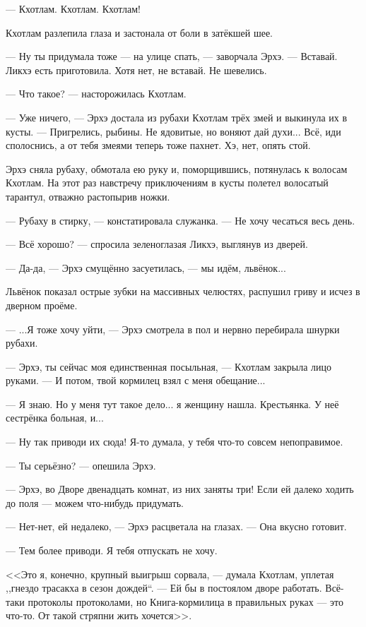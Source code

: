 \documentclass[a4paper,10pt,fleqn]{book}\usepackage{cooltooltips}\usepackage{polyglossia}\setdefaultlanguage{english}\setotherlanguage{russian}\defaultfontfeatures{Ligatures=TeX,Mapping=tex-text} \usepackage{xcolor}\definecolor{lightgray}{HTML}{bbbbbb}\color{lightgray}\newcommand{\ml}[3]{\textcolor{black}{#3}}
\newcommand{\asterism}{\vspace{1em}{\centering\Large\bfseries$\ast~\ast~\ast$\par}\vspace{1em}}
\begin{document}
\asterism

--- Кхотлам.
Кхотлам.
Кхотлам!

Кхотлам разлепила глаза и застонала от боли в затёкшей шее.

--- Ну ты придумала тоже --- на улице спать, --- заворчала Эрхэ.
--- Вставай.
Ликхэ есть приготовила.
Хотя нет, не вставай.
Не шевелись.

--- Что такое? --- насторожилась Кхотлам.

--- Уже ничего, --- Эрхэ достала из рубахи Кхотлам трёх змей и выкинула их в кусты.
--- Пригрелись, рыбины.
Не ядовитые, но воняют дай духи...
Всё, иди сполоснись, а от тебя змеями теперь тоже пахнет.
Хэ, нет, опять стой.

Эрхэ сняла рубаху, обмотала ею руку и, поморщившись, потянулась к волосам Кхотлам.
На этот раз навстречу приключениям в кусты полетел волосатый тарантул, отважно растопырив ножки.

--- Рубаху в стирку, --- констатировала служанка.
--- Не хочу чесаться весь день.

--- Всё хорошо? --- спросила зеленоглазая Ликхэ, выглянув из дверей.

--- Да-да, --- Эрхэ смущённо засуетилась, --- мы идём, львёнок...

Львёнок показал острые зубки на массивных челюстях, распушил гриву и исчез в дверном проёме.

--- ...Я тоже хочу уйти, --- Эрхэ смотрела в пол и нервно перебирала шнурки рубахи.

--- Эрхэ, ты сейчас моя единственная посыльная, --- Кхотлам закрыла лицо руками.
--- И потом, твой кормилец взял с меня обещание...

--- Я знаю.
Но у меня тут такое дело... я женщину нашла.
Крестьянка.
У неё сестрёнка больная, и...

--- Ну так приводи их сюда!
Я-то думала, у тебя что-то совсем непоправимое.

--- Ты серьёзно? --- опешила Эрхэ.

--- Эрхэ, во Дворе двенадцать комнат, из них заняты три!
Если ей далеко ходить до поля --- можем что-нибудь придумать.

--- Нет-нет, ей недалеко, --- Эрхэ расцветала на глазах.
--- Она вкусно готовит.

--- Тем более приводи.
Я тебя отпускать не хочу.

<<Это я, конечно, крупный выигрыш сорвала, --- думала Кхотлам, уплетая ,,гнездо трасакха в сезон дождей``.
--- Ей бы в постоялом дворе работать.
Всё-таки протоколы протоколами, но Книга-кормилица в правильных руках --- это что-то.
От такой стряпни жить хочется>>.
\end{document}
